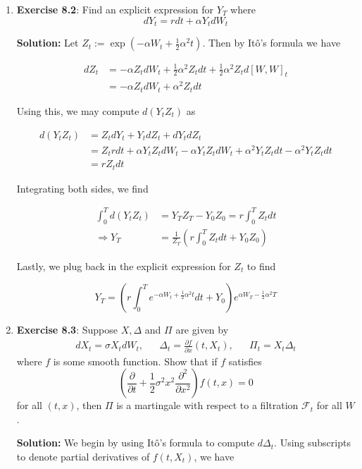 \documentclass[12pt, a4paper]{article}
\begin{document}
\begin{enumerate}
\item \textbf{Exercise 8.2}: Find an explicit expression for $Y_T$ where $$dY_t = rdt + \alpha Y_t dW_t$$

\textbf{Solution:} Let $Z_t := \exp(-\alpha W_t + \frac{1}{2} \alpha^2 t)$. Then by Itô's formula we have

\begin{align*}
    dZ_t &= -\alpha Z_t dW_t + \frac{1}{2} \alpha^2 Z_t dt + \frac{1}{2} \alpha^2 Z_t d[W,W]_t \\
    &= -\alpha Z_t dW_t + \alpha^2 Z_t dt
\end{align*}

Using this, we may compute $d(Y_t Z_t)$ as 

\begin{align*}
    d(Y_t Z_t) &= Z_t dY_t + Y_t dZ_t + dY_t dZ_t \\
    &= Z_t r dt + \alpha Y_t Z_t dW_t -\alpha Y_t Z_t dW_t + \alpha^2 Y_t Z_t dt - \alpha^2 Y_t Z_t dt \\
    &= rZ_t dt
\end{align*}

Integrating both sides, we find 

\begin{align*}
    \int_0^T d(Y_t Z_t) &= Y_T Z_T - Y_0 Z_0 = r \int_0^T Z_t dt \\
    \Rightarrow Y_T &= \frac{1}{Z_T} \left( r\int_0^T Z_t dt + Y_0 Z_0 \right)
\end{align*}

Lastly, we plug back in the explicit expression for $Z_t$ to find 

$$Y_T = \left( r\int_0^T e^{-\alpha W_t + \frac{1}{2} \alpha^2 t} dt + Y_0 \right) e^{\alpha W_T - \frac{1}{2} \alpha^2 T}$$

\item \textbf{Exercise 8.3}: Suppose $X,\Delta$ and $\Pi$ are given by \begin{align*}
    dX_t=\sigma X_t dW_t, && \Delta_t = \frac{\partial f}{\partial x}(t,X_t), && \Pi_t=X_t \Delta_t
\end{align*}
where $f$ is some smooth function. Show that if $f$ satisfies $$\left( \frac{\partial}{\partial t} + \frac{1}{2} \sigma^2 x^2 \frac{\partial^2}{\partial x^2} \right) f(t,x)=0$$
for all $(t,x)$, then $\Pi$ is a martingale with respect to a filtration $\mathcal{F}_t$ for all $W$.

\textbf{Solution:} We begin by using Itô's formula to compute $d\Delta_t$. Using subscripts to denote partial derivatives of $f(t,X_t)$, we have


\end{enumerate}
\end{document}
